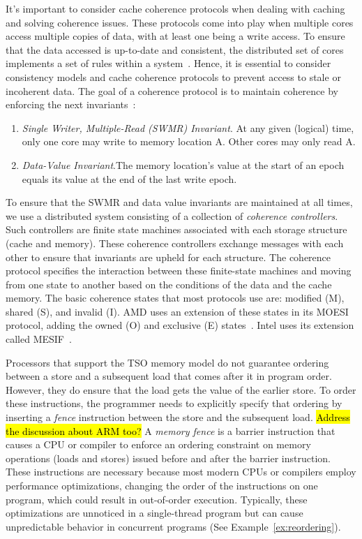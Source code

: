It's important to consider cache coherence protocols when dealing with caching and solving coherence issues. These protocols come into play when multiple cores access multiple copies of data, with at least one being a write access. To ensure that the data accessed is up-to-date and consistent, the distributed set of cores implements a set of rules within a system~\cite{DBLP_series_synthesis_2020Nagarajan}. Hence, it is essential to consider consistency models and cache coherence protocols to prevent access to stale or incoherent data. The goal of a coherence protocol is to maintain coherence by enforcing the next invariants~\cite{DBLP_series_synthesis_2020Nagarajan}:

\begin{enumerate}
  \item \emph{Single Writer, Multiple-Read (SWMR) Invariant}. At any given 
 (logical) time, only one core may write to memory location A. Other cores may only read A.

  \item \emph{Data-Value Invariant}.The memory location's value at the start of an epoch equals its value at the end of the last write epoch.
\end{enumerate}

To ensure that the SWMR and data value invariants are maintained at all times, we use a distributed system consisting of a collection of \emph{coherence controllers}. Such controllers are finite state machines associated with each storage structure (cache and memory). These coherence controllers exchange messages with each other to ensure that invariants are upheld for each structure. The coherence protocol specifies the interaction between these finite-state machines and moving from one state to another based on the conditions of the data and the cache memory. The basic coherence states that most protocols use are: modified (M), shared (S), and invalid (I). AMD uses an extension of these states in its MOESI protocol, adding the owned (O) and exclusive (E) states~\cite{devices_amd64}. Intel uses its extension called MESIF~\cite{guideintel}.

Processors that support the TSO memory model do not guarantee ordering between a store and a subsequent load that comes after it in program order. However, they do ensure that the load gets the value of the earlier store.  To order these instructions, the programmer needs to explicitly specify that ordering by inserting a \emph{fence} instruction between the store and the subsequent load.
\hl{Address the discussion about ARM too?}
A \emph{memory fence} is a barrier instruction that causes a CPU or compiler to enforce an ordering constraint on memory operations (loads and stores) issued before and after the barrier instruction. These instructions are necessary because most modern CPUs or compilers employ performance optimizations, changing the order of the instructions on one program, which could result in out-of-order execution. Typically, these optimizations are unnoticed in a single-thread program but can cause unpredictable behavior in concurrent programs (See Example~\ref{ex:reordering}).

